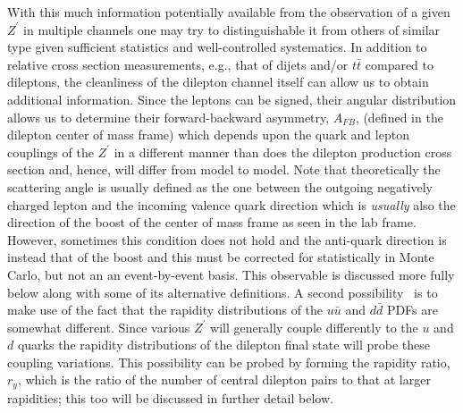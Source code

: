 \documentclass[a4paper,11pt]{article}
\newcommand{\Zp}{\ensuremath{Z^{\prime}}}
\begin{document}
With this much information potentially available from the observation of a given $\Zp$ in multiple channels one may try to distinguishable it from others of similar type given
sufficient statistics and
well-controlled systematics. In addition to relative cross section measurements,  e.g., that of dijets and/or $t\bar t$ compared to dileptons, the cleanliness of the dilepton channel itself
can allow us to obtain additional information.  Since the leptons can be signed, their angular distribution allows us to determine their forward-backward asymmetry, $A_{FB}$, (defined in the
dilepton center of mass frame) which depends upon the quark and lepton couplings of the $\Zp$ in a different manner than does the dilepton production cross section and, hence, will
differ from model to model. Note that theoretically the scattering angle is usually defined as the one between the outgoing negatively charged lepton and the incoming valence quark direction which is {\it usually} also the direction of the boost of the center of mass frame as seen in the lab frame. However, sometimes this condition does not hold and the anti-quark direction is
instead that of the boost and this must be corrected for statistically in Monte Carlo, but not an an event-by-event basis. This observable is discussed more fully below along with some of its
alternative definitions. A second possibility~\cite{delAguila:1993ym} is to make use of the fact
that the rapidity distributions of the $u\bar u$ and $d\bar d$ PDFs are somewhat different. Since various $\Zp$ will generally couple differently to the  $u$ and $d$ quarks the
rapidity distributions of the dilepton final state will probe these coupling variations. This possibility can be probed by forming the rapidity ratio, $r_y$, which is the ratio of the number of
central dilepton pairs to that at larger rapidities; this too will be discussed in further detail below.
\end{document}
